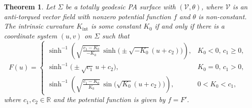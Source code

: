 \documentclass[12pt,reqno]{amsart}
\def\r{\mathbb R}
\def\v{\mathcal V}
\newtheorem{theorem}{Theorem}[section]
\theoremstyle{definition}
\begin{document}
\begin{theorem}\label{classtotgeo}
Let $\Sigma$ be a totally geodesic PA surface with $(\v,\theta)$, where $\v$ is an anti-torqued vector field with nonzero potential function $f$ and $\theta$ is non-constant. The intrinsic curvature $K_{\mathrm{int}}$ is some constant $K_0$ if and only if there is a coordinate system $(u,v)$ on $\Sigma$ such that 
\begin{equation}\label{ODEtg0}
F(u)=
\begin{cases}
\displaystyle
\sinh^{-1}\!\left(
\sqrt{\frac{c_1-K_0}{-K_0}}\,
\sinh\big(\pm\sqrt{-K_0}(u+c_2)\big)
\right) , & K_0<0, \, c_1\geq 0,\\[14pt]
\displaystyle
\sinh^{-1}\big(\pm\sqrt{c_1}\,u+c_2\big), & K_0=0, \, c_1>0,\\[10pt]
\displaystyle
\sinh^{-1}\!\left(
\sqrt{\frac{c_1-K_0}{K_0}}\,
\sin\big(\sqrt{K_0}(u+c_2)\big)
\right), & 0<K_0<c_1, 
\end{cases}
\end{equation}
where $c_1,c_2\in \r$  and the potential function is given by $f=F'$.
\end{theorem}
\end{document}
